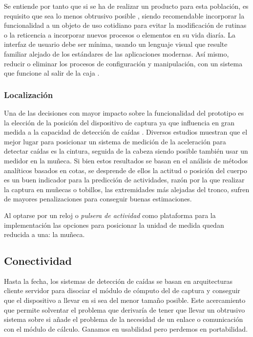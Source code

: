 Se entiende por tanto que si se ha de realizar un producto para esta población, es requisito que sea lo menos obtrusivo posible , siendo recomendable incorporar la funcionalidad a un objeto de uso cotidiano para evitar la modificación de rutinas o la reticencia a incorporar nuevos procesos o elementos en su vida diaría. La interfaz de usuario debe ser mínima, usando un lenguaje visual que resulte familiar alejado de los estándares de las aplicaciones modernas. Así mismo, reducir o eliminar los procesos de configuración y manipulación, con un sistema que funcione al salir de la caja .

\subsubsection{Localización}

Una de las decisiones con mayor impacto sobre la funcionalidad del prototipo es la elección de la posición del dispositivo de captura ya que influencia en gran medida a la capacidad de detección de caídas \cite{Kangas2008}. Diversos estudios muestran que el mejor lugar para posicionar un sistema de medición de la aceleración para detectar caídas es la cintura, seguida de la cabeza siendo posible también usar un medidor en la muñeca\cite{Chen2005, Kangas2008, Noury2007}. Si bien estos resultados se basan en el análisis de métodos analíticos basados en cotas, se desprende de ellos la actitud o posición del cuerpo es un buen indicador para la predicción de actividades, razón por la que realizar la captura en muñecas o tobillos, las extremidades más alejadas del tronco, sufren de mayores penalizaciones para conseguir buenas estimaciones.

Al optarse por un reloj o \textit{pulsera de actividad} como plataforma para la implementación las opciones para posicionar la unidad de medida quedan reducida a una: la muñeca.

\subsection{Conectividad}

Hasta la fecha, los sistemas de detección de caídas se basan en arquitecturas cliente servidor para disociar el módulo de cómputo del de captura y conseguir que el dispositivo a llevar en si sea del menor tamaño posible. Este acercamiento que permite solventar el problema que derivaría de tener que llevar un obtrusivo sistema sobre si añade el problema de la necesidad de un enlace o comunicación con el módulo de cálculo. Ganamos en usabilidad pero perdemos en portabilidad.

